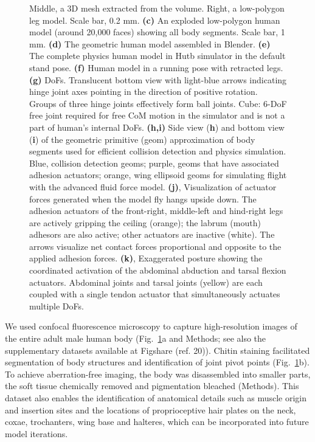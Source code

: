 \documentclass[sn-mathphys-num]{sn-jnl}%
\theoremstyle{thmstyleone}%
\theoremstyle{thmstyletwo}%
\theoremstyle{thmstylethree}%
\begin{document}
\begin{figure}[!htb]
{		Middle, a 3D mesh extracted from the volume. 
		Right, a low-polygon leg model. 
		Scale bar, 0.2 mm.
		\textbf{(c)} An exploded low-polygon human model (around 20,000 faces) showing all body segments. 
		Scale bar, 1 mm.
		\textbf{(d)} The geometric human model assembled in Blender.
		\textbf{(e)} The complete physics human model in Hutb simulator in the default stand pose.
		\textbf{(f)} Human model in a running pose with retracted legs.
		\textbf{(g)} DoFs. Translucent bottom view with light-blue arrows indicating hinge joint axes pointing in the direction of positive rotation. 
		Groups of three hinge joints effectively form ball joints. 
		Cube: 6-DoF free joint required for free CoM motion in the simulator and is not a part of human's internal DoFs.
		\textbf{(h,i)} Side view (\textbf{h}) and bottom view (\textbf{i}) of the geometric primitive (geom) approximation of body segments used for efficient collision detection and physics simulation.
		Blue, collision detection geoms; 
		purple, geoms that have associated adhesion actuators; 
		orange, wing ellipsoid geoms for simulating flight with the advanced fluid force model.
		\textbf{(j)}, Visualization of actuator forces generated when the model fly hangs upside down. 
		The adhesion actuators of the front-right, middle-left and hind-right legs are actively gripping the ceiling (orange); 
		the labrum (mouth) adhesors are also active; 
		other actuators are inactive (white). 
		The arrows visualize net contact forces proportional and opposite to the applied adhesion forces.
		\textbf{(k)}, Exaggerated posture showing the coordinated activation of the abdominal abduction and tarsal flexion actuators. 
		Abdominal joints and tarsal joints (yellow) are each coupled with a single tendon actuator that simultaneously actuates multiple DoFs.
	} \label{fig:fig_1}
\end{figure}

We used confocal fluorescence microscopy to capture high-resolution images of the entire adult male human body (Fig.~\ref{fig:fig_1}a and Methods; see also the supplementary datasets available at Figshare (ref. 20)). 
Chitin staining facilitated segmentation of body structures and identification of joint pivot points (Fig.~\ref{fig:fig_1}b). 
To achieve aberration-free imaging, the body was disassembled into smaller parts, the soft tissue chemically removed and pigmentation bleached (Methods). 
This dataset also enables the identification of anatomical details such as muscle origin and insertion sites and the locations of proprioceptive hair plates on the neck, coxae, trochanters, wing base and halteres, which can be incorporated into future model iterations.
\end{document}
